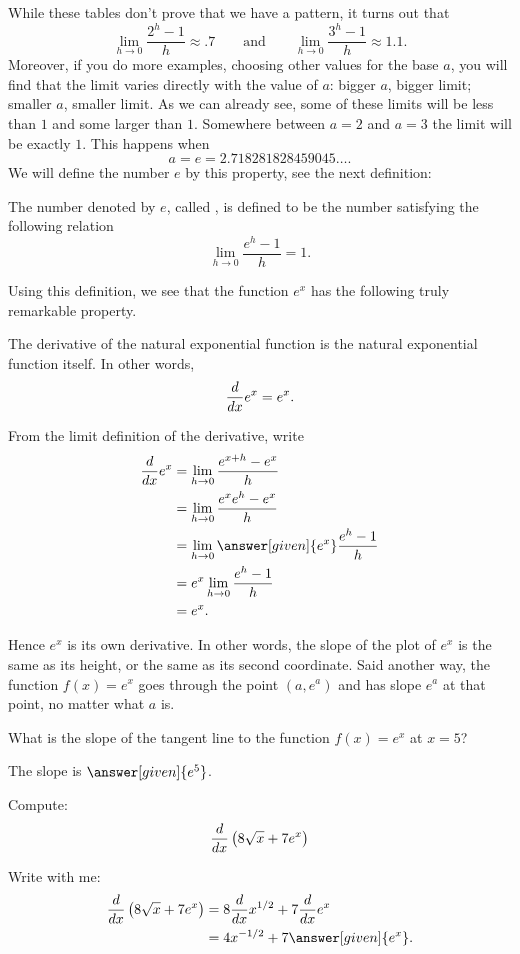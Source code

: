 \documentclass{ximera}
\begin{document}
While these tables don't prove that we have a pattern, it turns out that
\[
\lim_{h\to 0}\frac{2^h-1}{h} \approx .7 \qquad\text{and}\qquad \lim_{h\to 0} \frac{3^h-1}{h} \approx 1.1.
\]
Moreover, if you do more examples, choosing other values for the 
base $a$, you will find that the limit varies
directly with the value of $a$: bigger $a$, bigger limit; smaller $a$,
smaller limit. As we can already see, some of these limits will be
less than $1$ and some larger than $1$. Somewhere between $a=2$ and $a=3$
the limit will be exactly $1$. This happens when 
\[
a = e = 2.718281828459045\dots.
\]
We will define the number $e$ by this property, see the next
definition:
\begin{definition}
  The number denoted by $e$, called , is defined
  to be the number satisfying the following relation
  \[
  \lim_{h\to 0} \frac{e^h-1}{h} = 1.
  \]
\end{definition}
Using this definition, we see that the function $e^x$ has the following truly remarkable property.

\begin{theorem}
The derivative of the natural exponential function is the natural exponential function itself.  In other words,
\[
\frac{d}{\mathop{}\!d x} e^x = e^x.
\]
\begin{explanation}  
From the limit definition of the derivative, write
\begin{align*}
\ddx e^x&=\lim_{h\to 0} \frac{e^{x+h}-e^x}{h} \\
&=\lim_{h\to 0} \frac{e^xe^{h}-e^x}{h} \\
&=\lim_{h\to 0} \answer[given]{e^x}\frac{e^{h}-1}{h} \\
&=e^x\lim_{h\to 0} \frac{e^{h}-1}{h} \\
&=e^x.
\end{align*}
\end{explanation}
\end{theorem}


Hence $e^x$ is its own derivative. In other words, the slope of the
plot of $e^x$ is the same as its height, or the same as its second
coordinate.  Said another way, the function $f(x)=e^x$ goes through the point $(a,e^a)$
and has slope $e^a$ at that point, no matter what $a$ is. 

\begin{question}
  What is the slope of the tangent line to the function $f(x) = e^x$ at $x = 5$?
  \begin{prompt}
    The slope is $\answer[given]{e^5}$.
  \end{prompt}
\end{question}



\begin{example}
Compute:
\[
\frac{d}{\mathop{}\!d x}\left(8\sqrt{x} + 7e^x \right)
\]
\begin{explanation}
Write with me:
\begin{align*}
\ddx\left(8\sqrt{x} + 7e^x \right) &= 8\ddx x^{1/2} + 7\ddx e^x\\
&= 4x^{-1/2} + 7 \answer[given]{e^x}.
\end{align*}
\end{explanation}
\end{example}
\end{document}
